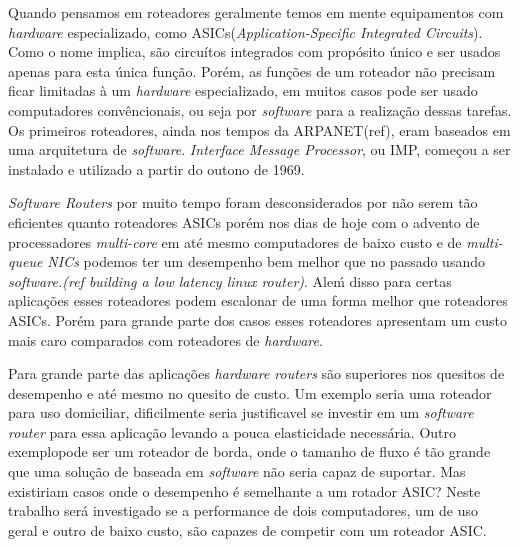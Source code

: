 Quando pensamos em roteadores geralmente temos em mente equipamentos com \textit{hardware} especializado, como ASICs(\textit{Application-Specific Integrated Circuits}). Como o nome implica, são circuítos integrados com propósito único e ser usados apenas para esta única função. Porém, as funções de um roteador não precisam ficar limitadas à um \textit{hardware} especializado, em muitos casos pode ser usado computadores convêncionais, ou seja por \textit{software} para a realização dessas tarefas. 
Os primeiros roteadores, ainda nos tempos da ARPANET(ref), eram baseados em uma arquitetura de \textit{software}. \textit{Interface Message Processor}, ou IMP, começou a ser instalado e utilizado a partir do outono de 1969.%

\textit{Software Routers} por muito tempo foram desconsiderados por não serem tão eficientes quanto roteadores ASICs porém nos dias de hoje com o advento de processadores \textit{multi-core} em até mesmo computadores de baixo custo e de \textit{multi-queue NICs} podemos ter um desempenho bem melhor que no passado usando \textit{software.(ref building a low latency linux router)}. Aleḿ disso para certas aplicações esses roteadores podem escalonar de uma forma melhor que roteadores ASICs. Porém para grande parte dos casos esses roteadores apresentam um custo mais caro comparados com roteadores de \textit{hardware}.


Para grande parte das aplicações \textit{hardware routers} são superiores nos quesitos de desempenho e até mesmo no quesito de custo. Um exemplo seria uma roteador para uso domiciliar, dificilmente seria justificavel se investir em um \textit{software router} para essa aplicação levando a pouca elasticidade necessária. Outro exemplopode ser um roteador de borda, onde o tamanho de fluxo é tão grande que uma solução de baseada em \textit{software} não seria capaz de suportar. Mas existiriam casos onde o desempenho é semelhante a um rotador ASIC? Neste trabalho será investigado se a performance de dois computadores, um de uso geral e outro de baixo custo, são capazes de competir com um roteador ASIC.
